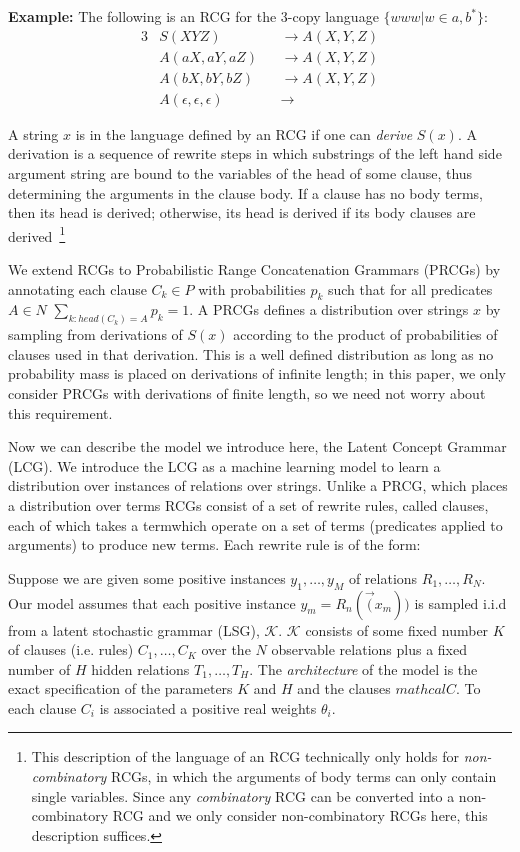 \documentclass[11pt, twocolumn]{article}
\begin{document}
\textbf{Example:} The following is an RCG for the 3-copy language
$\{www | w \in {a, b}^*\}$:
\begin{alignat*}{3}
&S(XYZ) &&\rightarrow A(X, Y, Z)\\
&A(aX, aY, aZ) &&\rightarrow A(X, Y, Z)\\
&A(bX, bY, bZ) &&\rightarrow A(X, Y, Z)\\
&A(\epsilon, \epsilon, \epsilon) &&\rightarrow 
\end{alignat*}

A string $x$ is in the language defined by an RCG if one can
\emph{derive} $S(x)$. A derivation is a sequence of rewrite steps in
which substrings of the left hand side argument string are bound to
the variables of the head of some clause, thus determining the
arguments in the clause body. If a clause has no body terms, then its
head is derived; otherwise, its head is derived if its body clauses
are derived~\footnote{This description of the language of an RCG
  technically only holds for \emph{non-combinatory} RCGs, in which the
  arguments of body terms can only contain single variables. Since any
  \emph{combinatory} RCG can be converted into a non-combinatory RCG
  and we only consider non-combinatory RCGs here, this description
  suffices.}

We extend RCGs to Probabilistic Range Concatenation Grammars (PRCGs)
by annotating each clause $C_k \in P$ with probabilities $p_k$ such
that for all predicates $A \in N$ $\sum_{k:head(C_k)=A} p_k = 1$. A
PRCGs defines a distribution over strings $x$ by sampling from
derivations of $S(x)$ according to the product of probabilities of
clauses used in that derivation. This is a well defined distribution
as long as no probability mass is placed on derivations of infinite
length; in this paper, we only consider PRCGs with derivations of
finite length, so we need not worry about this requirement.

Now we can describe the model we introduce here, the Latent Concept
Grammar (LCG). We introduce the LCG as a machine learning model to
learn a distribution over instances of relations over strings. Unlike
a PRCG, which places a distribution over terms RCGs consist of a set
of rewrite rules, called clauses, each of which takes a termwhich
operate on a set of terms (predicates applied to arguments) to produce
new terms. Each rewrite rule is of the form:

Suppose we are given some positive instances $y_1, \dots,
y_M$ of relations $R_1, \dots, R_N$. Our model assumes that each
positive instance $y_m=R_n(\vec(x_m))$ is sampled i.i.d from a latent
stochastic grammar (LSG), $\mathcal{K}$. $\mathcal{K}$ consists of
some fixed number $K$ of clauses (i.e. rules) $C_1, \dots, C_K$ over
the $N$ observable relations plus a fixed number of $H$ hidden
relations $T_1, \dots, T_H$. The \emph{architecture} of the model is
the exact specification of the parameters $K$ and $H$ and the clauses
$mathcal{C}$. To each clause $C_i$ is associated a positive real
weights $\theta_i$.
\end{document}

